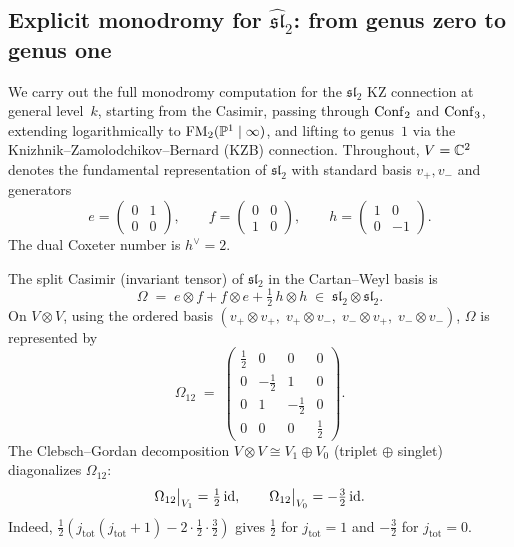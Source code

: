 \subsection{Explicit monodromy for $\widehat{\mathfrak{sl}}_2$: from genus zero to genus one}

We carry out the full monodromy computation for the $\mathfrak{sl}_2$ KZ connection
at general level~$k$, starting from the Casimir, passing through
$\mathrm{Conf}_2$ and $\mathrm{Conf}_3$, extending logarithmically to $\mathrm{FM}_2(\mathbb P^1\mid\infty)$,
and lifting to genus~$1$ via the Knizhnik--Zamolodchikov--Bernard (KZB) connection.
Throughout, $V=\mathbb C^2$ denotes the fundamental representation of $\mathfrak{sl}_2$
with standard basis $v_+,v_-$ and generators
\[
 e=\begin{pmatrix}0&1\\0&0\end{pmatrix},\qquad
 f=\begin{pmatrix}0&0\\1&0\end{pmatrix},\qquad
 h=\begin{pmatrix}1&0\\0&-1\end{pmatrix}.
\]
The dual Coxeter number is $h^\vee=2$.

\begin{computation}
The split Casimir (invariant tensor) of $\mathfrak{sl}_2$ in the
Cartan--Weyl basis is
\[
 \Omega \;=\; e\otimes f + f\otimes e + \tfrac{1}{2}\,h\otimes h
 \;\in\; \mathfrak{sl}_2\otimes\mathfrak{sl}_2.
\]
On $V\otimes V$, using the ordered basis
$(v_+\!\otimes\!v_+,\;v_+\!\otimes\!v_-,\;v_-\!\otimes\!v_+,\;v_-\!\otimes\!v_-)$,
$\Omega$ is represented by
\[
 \Omega_{12} \;=\;
 \begin{pmatrix}
 \frac{1}{2} & 0 & 0 & 0 \\[3pt]
 0 & -\frac{1}{2} & 1 & 0 \\[3pt]
 0 & 1 & -\frac{1}{2} & 0 \\[3pt]
 0 & 0 & 0 & \frac{1}{2}
 \end{pmatrix}.
\]
The Clebsch--Gordan decomposition $V\otimes V\cong V_1\oplus V_0$ (triplet $\oplus$ singlet)
diagonalizes $\Omega_{12}$:
\[
 \Omega_{12}\big|_{V_1}=\tfrac{1}{2}\,\mathrm{id},
 \qquad
 \Omega_{12}\big|_{V_0}=-\tfrac{3}{2}\,\mathrm{id}.
\]
Indeed, $\frac{1}{2}(j_{\mathrm{tot}}(j_{\mathrm{tot}}+1)-2\cdot\frac{1}{2}\cdot\frac{3}{2})$
gives $\frac{1}{2}$ for $j_{\mathrm{tot}}=1$ and $-\frac{3}{2}$ for $j_{\mathrm{tot}}=0$.
\end{computation}

